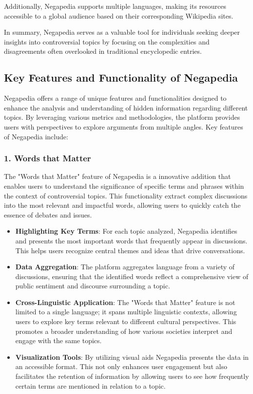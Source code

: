 Additionally, Negapedia supports multiple languages, making its resources accessible to a global audience based on their corresponding Wikipedia sites.

In summary, Negapedia serves as a valuable tool for individuals seeking deeper insights into controversial topics by focusing on the complexities and disagreements often overlooked in traditional encyclopedic entries.


\subsection{Key Features and Functionality of Negapedia}
\label{subsec:key_features_and_functionality_of_negapedia}

Negapedia offers a range of unique features and functionalities designed to enhance the analysis and understanding of hidden information regarding different topics. By leveraging various metrics and methodologies, the platform provides users with perspectives to explore arguments from multiple angles. Key features of Negapedia include:

\subsubsection{1. Words that Matter}

The "Words that Matter" feature of Negapedia is a innovative addition that enables users to understand the significance of specific terms and phrases within the context of controversial topics. This functionality extract complex discussions into the most relevant and impactful words, allowing users to quickly catch the essence of debates and issues.

\begin{itemize}
    \item \textbf{Highlighting Key Terms}: For each topic analyzed, Negapedia identifies and presents the most important words that frequently appear in discussions. This helps users recognize central themes and ideas that drive conversations.
    \item \textbf{Data Aggregation}: The platform aggregates language from a variety of discussions, ensuring that the identified words reflect a comprehensive view of public sentiment and discourse surrounding a topic.
    \item \textbf{Cross-Linguistic Application}: The "Words that Matter" feature is not limited to a single language; it spans multiple linguistic contexts, allowing users to explore key terms relevant to different cultural perspectives. This promotes a broader understanding of how various societies interpret and engage with the same topics.
    \item \textbf{Visualization Tools}: By utilizing visual aids Negapedia presents the data in an accessible format. This not only enhances user engagement but also facilitates the retention of information by allowing users to see how frequently certain terms are mentioned in relation to a topic.
\end{itemize}

